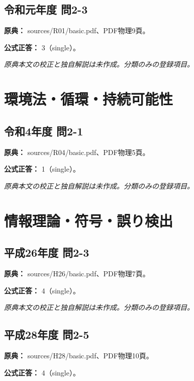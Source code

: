 \subsection{令和元年度 問2-3}
\label{q:r01-reg-basic-2-3}

\noindent\textbf{原典：} sources/R01/basic.pdf、PDF物理9頁。

\textbf{公式正答：} 3（single）。

\par\textit{原典本文の校正と独自解説は未作成。分類のみの登録項目。}

\section{環境法・循環・持続可能性}

\subsection{令和4年度 問2-1}
\label{q:r04-reg-basic-2-1}

\noindent\textbf{原典：} sources/R04/basic.pdf、PDF物理5頁。

\textbf{公式正答：} 1（single）。

\par\textit{原典本文の校正と独自解説は未作成。分類のみの登録項目。}

\section{情報理論・符号・誤り検出}

\subsection{平成26年度 問2-3}
\label{q:h26-reg-basic-2-3}

\noindent\textbf{原典：} sources/H26/basic.pdf、PDF物理7頁。

\textbf{公式正答：} 4（single）。

\par\textit{原典本文の校正と独自解説は未作成。分類のみの登録項目。}

\subsection{平成28年度 問2-5}
\label{q:h28-reg-basic-2-5}

\noindent\textbf{原典：} sources/H28/basic.pdf、PDF物理10頁。

\textbf{公式正答：} 4（single）。

